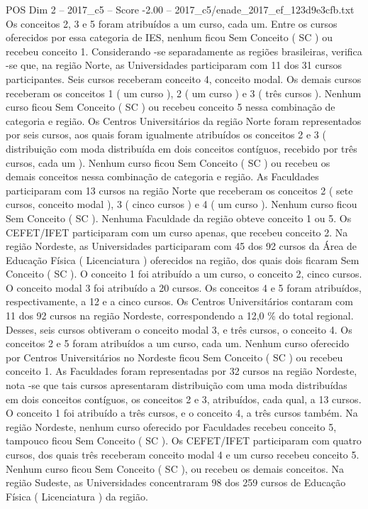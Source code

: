 \begin{textsample}{POS Dim 2 – 2017\_c5 – Score -2.00 – 2017\_c5/enade\_2017\_ef\_123d9e3cfb.txt}
Os conceitos 2, 3 e 5 foram atribuídos a um curso, cada um.
Entre os cursos oferecidos por essa categoria de IES, nenhum ficou Sem Conceito ( SC ) ou recebeu conceito 1.
Considerando -se separadamente as regiões brasileiras, verifica -se que, na região Norte, as Universidades participaram com 11 dos 31 cursos participantes.
Seis cursos receberam conceito 4, conceito modal.
Os demais cursos receberam os conceitos 1 ( um curso ), 2 ( um curso ) e 3 ( três cursos ).
Nenhum curso ficou Sem Conceito ( SC ) ou recebeu conceito 5 nessa combinação de categoria e região.
Os Centros Universitários da região Norte foram representados por seis cursos, aos quais foram igualmente atribuídos os conceitos 2 e 3 ( distribuição com moda distribuída em dois conceitos contíguos, recebido por três cursos, cada um ).
Nenhum curso ficou Sem Conceito ( SC ) ou recebeu os demais conceitos nessa combinação de categoria e região.
As Faculdades participaram com 13 cursos na região Norte que receberam os conceitos 2 ( sete cursos, conceito modal ), 3 ( cinco cursos ) e 4 ( um curso ).
Nenhum curso ficou Sem Conceito ( SC ).
Nenhuma Faculdade da região obteve conceito 1 ou 5.
Os CEFET/IFET participaram com um curso apenas, que recebeu conceito 2.
Na região Nordeste, as Universidades participaram com 45 dos 92 cursos da Área de Educação Física ( Licenciatura ) oferecidos na região, dos quais dois ficaram Sem Conceito ( SC ).
O conceito 1 foi atribuído a um curso, o conceito 2, cinco cursos.
O conceito modal 3 foi atribuído a 20 cursos.
Os conceitos 4 e 5 foram atribuídos, respectivamente, a 12 e a cinco cursos.
Os Centros Universitários contaram com 11 dos 92 cursos na região Nordeste, correspondendo a 12,0 \% do total regional.
Desses, seis cursos obtiveram o conceito modal 3, e três cursos, o conceito 4.
Os conceitos 2 e 5 foram atribuídos a um curso, cada um.
Nenhum curso oferecido por Centros Universitários no Nordeste ficou Sem Conceito ( SC ) ou recebeu conceito 1.
As Faculdades foram representadas por 32 cursos na região Nordeste, nota -se que tais cursos apresentaram distribuição com uma moda distribuídas em dois conceitos contíguos, os conceitos 2 e 3, atribuídos, cada qual, a 13 cursos.
O conceito 1 foi atribuído a três cursos, e o conceito 4, a três cursos também.
Na região Nordeste, nenhum curso oferecido por Faculdades recebeu conceito 5, tampouco ficou Sem Conceito ( SC ).
Os CEFET/IFET participaram com quatro cursos, dos quais três receberam conceito modal 4 e um curso recebeu conceito 5.
Nenhum curso ficou Sem Conceito ( SC ), ou recebeu os demais conceitos.
Na região Sudeste, as Universidades concentraram 98 dos 259 cursos de Educação Física ( Licenciatura ) da região.

\end{textsample}
